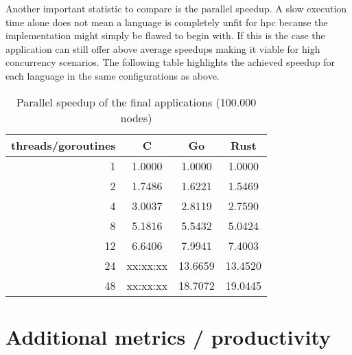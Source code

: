Another important statistic to compare is the parallel speedup. A slow execution time alone does not mean a language is completely unfit for \gls{hpc} because the implementation might simply be flawed to begin with. If this is the case the application can still offer above average speedups making it viable for high concurrency scenarios. The following table highlights the achieved speedup for each language in the same configurations as above.

\begin{table}[htb]
    \centering
    \begin{tabular}{rccc}
        \toprule
            threads/goroutines
            & C
            & Go
            & Rust \\
        \midrule

            1
            & 1.0000
            & 1.0000
            & 1.0000 \\

            2
            & 1.7486
            & 1.6221
            & 1.5469 \\

            4
            & 3.0037
            & 2.8119
            & 2.7590 \\

            8
            & 5.1816
            & 5.5432
            & 5.0424 \\

            12
            & 6.6406
            & 7.9941
            & 7.4003 \\

            24
            & xx:xx:xx
            & 13.6659
            & 13.4520 \\

            48
            & xx:xx:xx
            & 18.7072
            & 19.0445 \\

        \bottomrule
    \end{tabular}
    \caption{Parallel speedup of the final applications (100.000 nodes)}
    \label{tb:final_speedup}
\end{table}

\section{Additional metrics / productivity}
\label{sec:Evaluation::Metrics}

